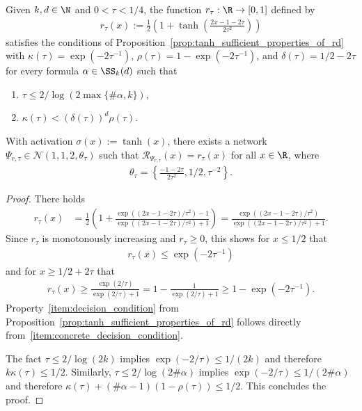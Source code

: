 \documentclass{amsart}[11pt]
\numberwithin{equation}{section}
\newcommand{\nn}{\mathcal{N}}
\newcommand{\realization}{\mathcal{R}}
\numberwithin{theorem}{section}
\begin{document}
\begin{lemma}\label{lem:thanhr}
    Given $k, d \in \N$ and $0 < \tau < 1/4$, the function $r_\tau: \R \to [0, 1]$ defined by
    \begin{align*}
        r_\tau(x) := \frac{1}{2} \left(1 + \tanh\left(\frac{2x - 1 - 2\tau}{2\tau^2}\right)\right)
    \end{align*}
    satisfies the conditions of Proposition~\ref{prop:tanh_sufficient_properties_of_rd} with    $\kappa(\tau) = \exp(-2\tau^{-1})$,
   $\rho(\tau) = 1  - \exp(-2\tau^{-1})$, and $\delta(\tau) = 1/2 - 2\tau$  
    for every formula $\alpha \in \SS_k(d)$ such that
    \begin{enumerate}[label=(\roman*)]
        \item $\tau \leq 2/ \log\left(2\max\{\#\alpha, k\}\right)$,
        \item $\kappa(\tau) < \left(\delta(\tau)\right)^d \rho(\tau)$. \label{item:concrete_decision_condition}
    \end{enumerate}
    With activation $\sigma(x):=\tanh(x)$, there exists a network $\Psi_{r,\tau}\in \nn(1,1,2,\theta_\tau)$ such that $\realization_{\Psi_{r,\tau}}(x) = r_\tau(x)$ for all $x \in \R$,
    where 
    \begin{align*}
        \theta_\tau = \left\{\frac{-1 - 2\tau}{2\tau^2}, 1/2,\tau^{-2}\right\}.
    \end{align*}
\end{lemma}
\begin{proof}
    There holds
    \begin{align*}
        r_\tau(x) &= \frac12\left(1+\frac{ \exp((2x-1-2\tau)/\tau^2)-1}{\exp((2x-1-2\tau)/\tau^2)+1}\right)= \frac{ \exp((2x-1-2\tau)/\tau^2)}{\exp((2x-1-2\tau)/\tau^2)+1}.
    \end{align*}
    Since $r_\tau$ is monotonously increasing and $r_\tau \geq 0$, this shows for $x \leq 1/2$ that 
    \begin{align*}
        r_\tau(x) \leq \exp(-2\tau^{-1}) 
    \end{align*}
    and for $x \geq 1/2 + 2\tau$ that
    \begin{align*}
        r_\tau(x) \geq  \frac{ \exp(2/\tau)}{\exp(2/\tau)+1} = 1- \frac{1}{\exp(2/\tau)+1} \geq 1 - \exp(-2\tau^{-1}).
    \end{align*}
    Property~\ref{item:decision_condition} from Proposition~\ref{prop:tanh_sufficient_properties_of_rd}  follows directly from~\ref{item:concrete_decision_condition}.

    The fact $\tau \leq 2/ \log(2k)$ implies $\exp(-2/\tau) \leq 1/(2k)$ and therefore $k\kappa(\tau) \leq 1/2$.
    Similarly, $\tau \leq 2/ \log(2\#\alpha)$ implies $\exp(-2/\tau) \leq 1/(2\#\alpha)$ and therefore $\kappa(\tau) + (\# \alpha - 1)(1 - \rho(\tau)) \leq 1/2$.
    This concludes the proof.
\end{proof}
\end{document}
